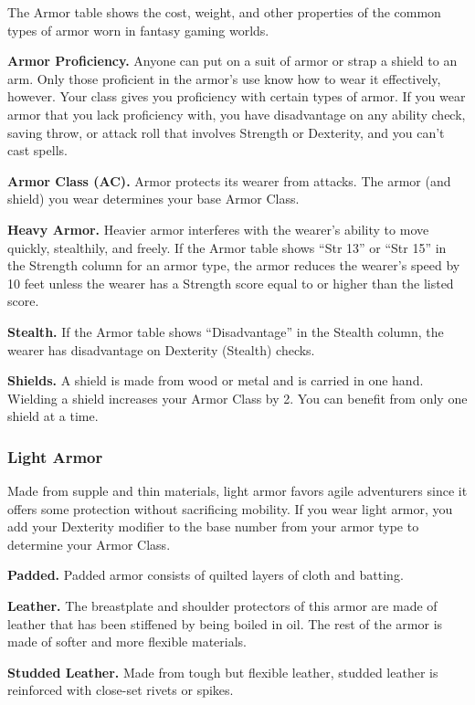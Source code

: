 \documentclass[
]{article}
\begin{document}
The Armor table shows the cost, weight, and other properties of the
common types of armor worn in fantasy gaming worlds.

\textbf{Armor Proficiency.} Anyone can put on a suit of armor or strap a
shield to an arm. Only those proficient in the armor's use know how to
wear it effectively, however. Your class gives you proficiency with
certain types of armor. If you wear armor that you lack proficiency
with, you have disadvantage on any ability check, saving throw, or
attack roll that involves Strength or Dexterity, and you can't cast
spells.

\textbf{Armor Class (AC).} Armor protects its wearer from attacks. The
armor (and shield) you wear determines your base Armor Class.

\textbf{Heavy Armor.} Heavier armor interferes with the wearer's ability
to move quickly, stealthily, and freely. If the Armor table shows ``Str
13'' or ``Str 15'' in the Strength column for an armor type, the armor
reduces the wearer's speed by 10 feet unless the wearer has a Strength
score equal to or higher than the listed score.

\textbf{Stealth.} If the Armor table shows ``Disadvantage'' in the
Stealth column, the wearer has disadvantage on Dexterity (Stealth)
checks.

\textbf{Shields.} A shield is made from wood or metal and is carried in
one hand. Wielding a shield increases your Armor Class by 2. You can
benefit from only one shield at a time.

\hypertarget{light-armor}{%
\subsubsection{Light Armor}\label{light-armor}}

Made from supple and thin materials, light armor favors agile
adventurers since it offers some protection without sacrificing
mobility. If you wear light armor, you add your Dexterity modifier to
the base number from your armor type to determine your Armor Class.

\textbf{Padded.} Padded armor consists of quilted layers of cloth and
batting.

\textbf{Leather.} The breastplate and shoulder protectors of this armor
are made of leather that has been stiffened by being boiled in oil. The
rest of the armor is made of softer and more flexible materials.

\textbf{Studded Leather.} Made from tough but flexible leather, studded
leather is reinforced with close-set rivets or spikes.
\end{document}
